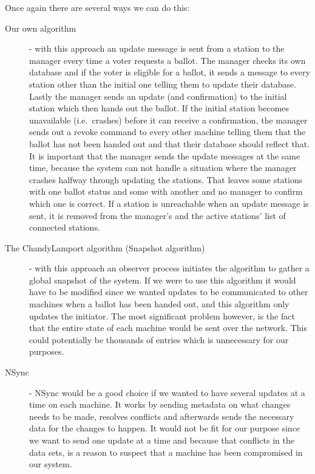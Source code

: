 \documentclass[a4paper]{report}
\begin{document}
\noindent Once again there are several ways we can do this:
\begin{description}

\item [Our own algorithm] - with this approach an update message is sent from a station to the manager every time a voter requests a ballot. The manager checks its own database and if the voter is eligible for a ballot, it sends a message to every station other than the initial one telling them to update their database. Lastly the manager sends an update (and confirmation) to the initial station which then hands out the ballot. If the initial station becomes unavailable (i.e.\ crashes) before it can receive a confirmation, the manager sends out a revoke command to every other machine telling them that the ballot has not been handed out and that their database should reflect that. It is important that the manager sends the update messages at the same time, because the system can not handle a situation where the manager crashes halfway through updating the stations. That leaves some stations with one ballot status and some with another and no manager to confirm which one is correct. If a station is unreachable when an update message is sent, it is removed from the manager's and the active stations' list of connected stations.

\item [The ChandyLamport algorithm (Snapshot algorithm)] \cite{lynch} \cite{chandy} - with this approach an observer process initiates the algorithm to gather a global snapshot of the system. If we were to use this algorithm it would have to be modified since we wanted updates to be communicated to other machines when a ballot has been handed out, and this algorithm only updates the initiator. The most significant problem however, is the fact that the entire state of each machine would be sent over the network. This could potentially be thousands of entries which is unnecessary for our purposes.

\item [NSync] \cite{nsync} - NSync would be a good choice if we wanted to have several updates at a time on each machine. It works by sending metadata on what changes needs to be made, resolves conflicts and afterwards sends the necessary data for the changes to happen. It would not be fit for our purpose since we want to send one update at a time and because that conflicts in the data sets, is a reason to suspect that a machine has been compromised in our system.

\end{description}
\end{document}
